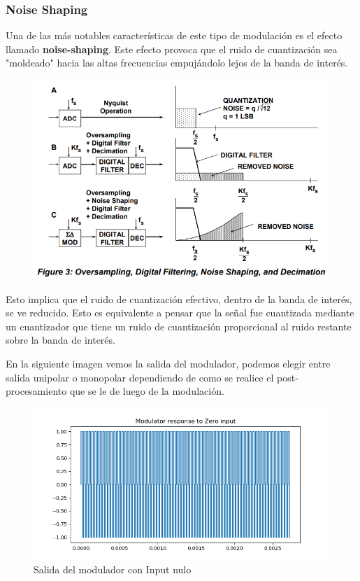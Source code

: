 \subsubsection{Noise Shaping}
Una de las más notables características de este tipo de modulación es el efecto llamado \textbf{noise-shaping}. Este efecto provoca que el ruido de cuantización sea "moldeado" hacia las altas frecuencias empujándolo lejos de la banda de interés.


\begin{figure}[H]
	\centering
	\includegraphics[width=0.7\linewidth]{ImagenesEjercicio2/NoiseShappingAN}
	\caption{}
	\label{fig:noiseshappingan}
\end{figure}


Esto implica que el ruido de cuantización efectivo, dentro de la banda de interés, se ve reducido. Esto es equivalente a pensar que la señal fue cuantizada mediante un cuantizador que tiene un ruido de cuantización proporcional al ruido restante sobre la banda de interés.

En la siguiente imagen vemos la salida del modulador, podemos elegir entre salida unipolar o monopolar dependiendo de como se realice el post-procesamiento que se le de luego de la modulación.
 
\begin{figure}[H]
	\centering
	\includegraphics[width=0.7\linewidth]{ImagenesEjercicio2/OutoutZeroInput}
	\caption{Salida del modulador con Input nulo}
	\label{fig:outoutzeroinput}
\end{figure}

